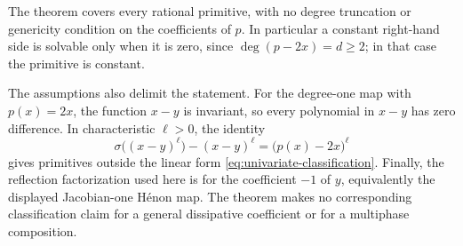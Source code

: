 The theorem covers every rational primitive, with no degree truncation or
genericity condition on the coefficients of $p$. In particular a constant
right-hand side is solvable only when it is zero, since
$\deg(p-2x)=d\ge2$; in that case the primitive is constant.

The assumptions also delimit the statement. For the degree-one map with
$p(x)=2x$, the function $x-y$ is invariant, so every polynomial in $x-y$
has zero difference. In characteristic $\ell>0$, the identity
\[
 \sigma\bigl((x-y)^\ell\bigr)-(x-y)^\ell
 =\bigl(p(x)-2x\bigr)^\ell
\]
gives primitives outside the linear form
\eqref{eq:univariate-classification}. Finally, the reflection factorization
used here is for the coefficient $-1$ of $y$, equivalently the displayed
Jacobian-one H\'enon map. The theorem makes no corresponding classification
claim for a general dissipative coefficient or for a multiphase
composition.
